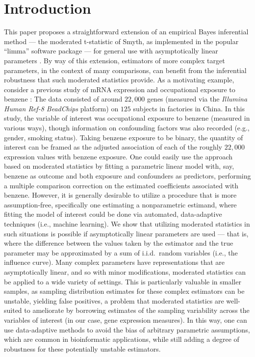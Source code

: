 \chapter{Introduction}

This paper proposes a straightforward extension of an empirical Bayes
inferential method --- the moderated t-statistic of Smyth, as implemented in the
popular ``limma'' software package \cite{smyth2004linear} --- for general use
with asymptotically linear parameters \cite{tsiatis2007semiparametric,
van2011targeted}. By way of this extension, estimators of more complex target
parameters, in the context of many comparisons, can benefit from the inferential
robustness that such moderated statistics provide. As a motivating example,
consider a previous study of mRNA expression and occupational exposure to
benzene \cite{mchale2011global}: The data consisted of around $22,000$ genes
(measured via the \textit{Illumina Human Ref-8 BeadChips} platform) on $125$
subjects in factories in China. In this study, the variable of interest was
occupational exposure to benzene (measured in various ways), though information
on confounding factors was also recorded (e.g., gender, smoking status). Taking
benzene exposure to be binary, the quantity of interest can be framed as the
adjusted association of each of the roughly $22,000$ expression values with
benzene exposure. One could easily use the approach based on moderated
statistics by fitting a parametric linear model with, say, benzene as outcome
and both exposure and confounders as predictors, performing a multiple
comparison correction on the estimated coefficients associated with benzene.
However, it is generally desirable to utilize a procedure that is more
assumption-free, specifically one estimating a nonparametric estimand, where
fitting the model of interest could be done via automated, data-adaptive
techniques (i.e., machine learning). We show that utilizing moderated statistics
in such situations is possible if asymptotically linear parameters are used ---
that is, where the difference between the values taken by the estimator and the
true parameter may be approximated by a sum of i.i.d.~random variables (i.e.,
the influence curve). Many complex parameters have representations that are
asymptotically linear, and so with minor modifications, moderated statistics can
be applied to a wide variety of settings. This is particularly valuable in
smaller samples, as sampling distribution estimates for these complex estimators
can be unstable, yielding false positives, a problem that moderated statistics
are well-suited to ameliorate by borrowing estimates of the sampling variability
across the variables of interest (in our case, gene expression measures). In
this way, one can use data-adaptive methods to avoid the bias of arbitrary
parametric assumptions, which are common in bioinformatic applications, while
still adding a degree of robustness for these potentially unstable estimators.

